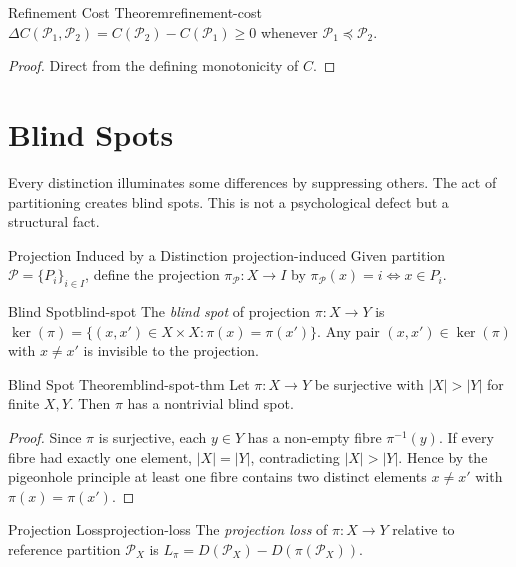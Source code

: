 \documentclass[12pt,twoside,openright]{book}
\newcommand{\partition}{\mathcal{P}}
\begin{document}
\begin{theorem}{Refinement Cost Theorem}{refinement-cost}
  $\Delta C(\partition_1, \partition_2)
  = C(\partition_2) - C(\partition_1) \ge 0$
  whenever $\partition_1 \preceq \partition_2$.
\end{theorem}

\begin{proof}
  Direct from the defining monotonicity of $C$.
\end{proof}

\section{Blind Spots}
\label{sec:ch1-blind}

Every distinction illuminates some differences by
suppressing others. The act of partitioning creates blind
spots. This is not a psychological defect but a
structural fact.

\begin{definition}{Projection Induced by a Distinction}%
  {projection-induced}
  Given partition $\partition = \{P_i\}_{i \in I}$,
  define the projection $\pi_\partition: X \to I$ by
  $\pi_\partition(x) = i \iff x \in P_i$.
\end{definition}

\begin{definition}{Blind Spot}{blind-spot}
  The \emph{blind spot} of projection $\pi: X \to Y$ is
  $\ker(\pi) = \{(x,x') \in X \times X : \pi(x) = \pi(x')\}$.
  Any pair $(x,x') \in \ker(\pi)$ with $x \ne x'$ is
  invisible to the projection.
\end{definition}

\begin{theorem}{Blind Spot Theorem}{blind-spot-thm}
  Let $\pi: X \to Y$ be surjective with $|X| > |Y|$
  for finite $X, Y$. Then $\pi$ has a nontrivial
  blind spot.
\end{theorem}

\begin{proof}
  Since $\pi$ is surjective, each $y \in Y$ has a
  non-empty fibre $\pi^{-1}(y)$. If every fibre had
  exactly one element, $|X| = |Y|$, contradicting
  $|X| > |Y|$. Hence by the pigeonhole principle at
  least one fibre contains two distinct elements
  $x \ne x'$ with $\pi(x) = \pi(x')$.
\end{proof}

\begin{definition}{Projection Loss}{projection-loss}
  The \emph{projection loss} of $\pi: X \to Y$ relative
  to reference partition $\partition_X$ is
  $L_\pi = D(\partition_X) - D(\pi(\partition_X))$.
\end{definition}
\end{document}
